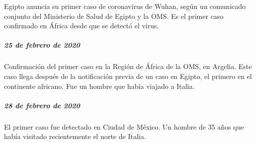 \documentclass[
  12pt,
]{article}
\begin{document}
Egipto anuncia su primer caso de coronavirus de Wuhan, según un
comunicado conjunto del Ministerio de Salud de Egipto y la OMS. Es el
primer caso confirmado en África desde que se detectó el virus.

\hypertarget{de-febrero-de-2020}{%
\subparagraph{\texorpdfstring{\textbf{25 de febrero de
2020}}{25 de febrero de 2020}}\label{de-febrero-de-2020}}

Confirmación del primer caso en la Región de África de la OMS, en
Argelia. Este caso llega después de la notificación previa de un caso en
Egipto, el primero en el continente africano. Fue un hombre que había
viajado a Italia.

\hypertarget{de-febrero-de-2020-1}{%
\subparagraph{\texorpdfstring{\textbf{28 de febrero de
2020}}{28 de febrero de 2020}}\label{de-febrero-de-2020-1}}

El primer caso fue detectado en Ciudad de México. Un hombre de 35 años
que había visitado recientemente el norte de Italia.
\end{document}
